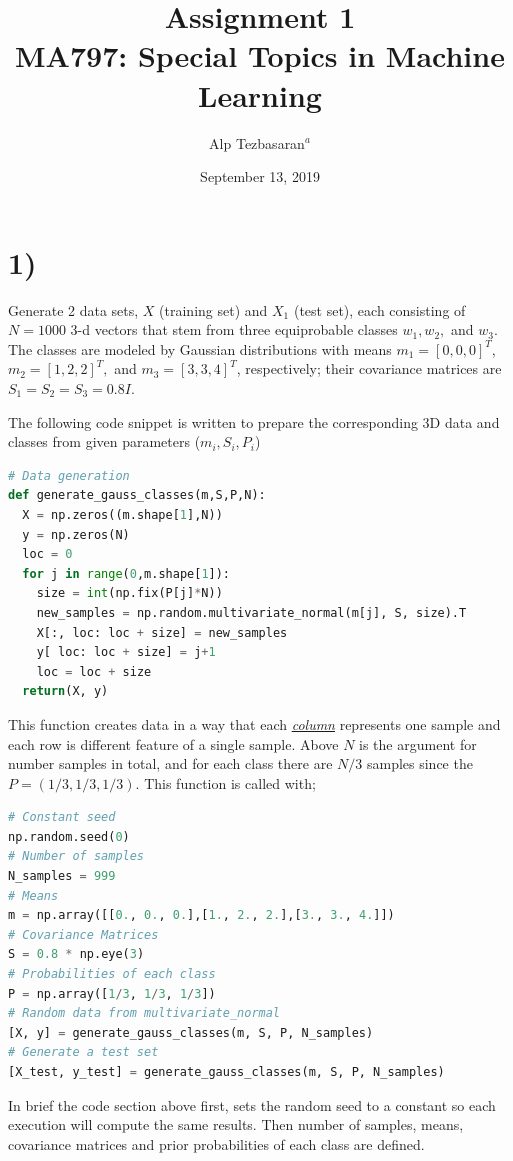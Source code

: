 \documentclass[11pt]{article}
\title{ \bf{Assignment 1 \\ MA797: Special Topics in Machine Learning}}
\author{Alp Tezbasaran$^{a}$}
\affil{\textit{$^{a}$Department of Nuclear Engineering NCSU, alptezbasaran@ncsu.edu}}
\date{September 13, 2019}
\begin{document}
\maketitle
\section*{1)} Generate 2 data sets, $X$ (training set) and $X_1$ (test set), each consisting of $N=1000$ 3-d vectors that stem from three equiprobable classes $w_1,w_2,$ and $w_3$. The classes are modeled by Gaussian distributions with means $m_1=[0,0,0]^T$, $m_2=[1,2,2]^T,$ and $m_3 = [3,3,4]^T$, respectively; their covariance matrices are $S_1=S_2=S_3=0.8I$.\medskip

The following code snippet is written to prepare the corresponding 3D data and classes from given parameters ($m_i,S_i,P_i$)

\begin{lstlisting}[language=Python, caption=Data Generation]
# Data generation
def generate_gauss_classes(m,S,P,N):
  X = np.zeros((m.shape[1],N))
  y = np.zeros(N)
  loc = 0
  for j in range(0,m.shape[1]):
    size = int(np.fix(P[j]*N))
    new_samples = np.random.multivariate_normal(m[j], S, size).T
    X[:, loc: loc + size] = new_samples
    y[ loc: loc + size] = j+1
    loc = loc + size
  return(X, y)
\end{lstlisting}

This function creates data in a way that each \underline{\emph{column}} represents one sample and each row is different feature of a single sample. Above $N$ is the argument for number samples in total, and for each class there are $N/3$ samples since the $P=(1/3,1/3,1/3)$. This function is called with;

\begin{lstlisting}[language=Python, caption=Data Generation Routine for Training and Test Sets]
# Constant seed
np.random.seed(0)
# Number of samples
N_samples = 999
# Means
m = np.array([[0., 0., 0.],[1., 2., 2.],[3., 3., 4.]])
# Covariance Matrices
S = 0.8 * np.eye(3)
# Probabilities of each class
P = np.array([1/3, 1/3, 1/3])
# Random data from multivariate_normal
[X, y] = generate_gauss_classes(m, S, P, N_samples)
# Generate a test set
[X_test, y_test] = generate_gauss_classes(m, S, P, N_samples)
\end{lstlisting}

In brief the code section above first, sets the random seed to a constant so each execution will compute the same results. Then number of samples, means, covariance matrices and prior probabilities of each class are defined. \medskip
\end{document}
